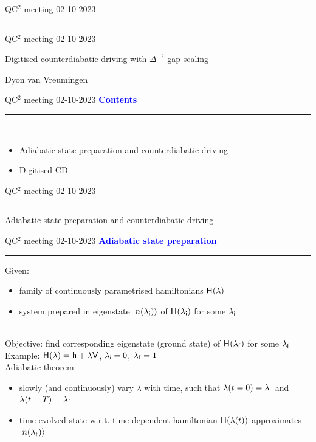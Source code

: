 \documentclass{beamer}
\def\gemph#1{{\color{mygreen}#1}}
\def\lbt{\small QC$^2$ meeting 02-10-2023} %
\def\mt#1{\kern0.025em\mathsf{#1}\kern0.025em}
\def\lambdai{\lambda_{\sf i}}
\def\lambdaf{\lambda_{\sf f}}
\def\H{\mt H}
\newenvironment{dia}[2]
{
	\begin{frame}
	\vspace{1mm}
	{\small #1}
	\hfill
    {\small\bf\textcolor{blue}{#2}}
	\vspace{3mm}
	\hrule
	\bigskip
}
{
	\vfill
	\end{frame}
}
\begin{document}

\begin{dia}{\lbt}{}
\vspace*{0.5cm}
\begin{center}
\begin{large}
QC$^2$ meeting 02-10-2023 \\[1.25cm]
\end{large}
\begin{LARGE}
\textcolor{mygreen}{Digitised counterdiabatic driving with $\Delta^{-?}$ gap scaling}\\[1.25cm]
\end{LARGE}
Dyon van Vreumingen
\end{center}
\end{dia}

\begin{dia}{\lbt}{Contents}
$ $\\
\begin{itemize}
    \setlength{\itemsep}{3mm}
    \item Adiabatic state preparation and counterdiabatic driving \pause
    \item Digitised CD
\end{itemize}
\vspace{3cm}
\end{dia}

\begin{dia}{\lbt}{}
\vspace{2.5cm}
\begin{center}
\begin{LARGE}
\textcolor{mygreen}{Adiabatic state preparation and counterdiabatic driving}
\end{LARGE}
\end{center}
\vspace*{1.5cm}
\end{dia}

\begin{dia}{\lbt}{Adiabatic state preparation}
Given: \pause
\begin{itemize}
    \item family of continuously parametrised hamiltonians $\H(\lambda)$ \pause
    \item system prepared in eigenstate $\ket{n(\lambdai)}$ of $\H(\lambdai)$ for some $\lambdai$ \pause
\end{itemize}
$ $\\[-2mm]
Objective: find corresponding eigenstate (ground state) of $\H(\lambdaf)$ for some $\lambdaf$ \pause \\[4mm]
Example: $\H(\lambda) = \mt h + \lambda \mt V$, $\lambdai = 0$, $\lambdaf = 1$ \pause \\[4mm]
\gemph{Adiabatic theorem}: \pause
\begin{itemize}
    \item slowly (and continuously) vary $\lambda$ with time, such that $\lambda(t=0) = \lambdai$ and $\lambda(t=T) = \lambdaf$ \pause
    \item time-evolved state w.r.t. time-dependent hamiltonian $\H(\lambda(t))$ approximates $\ket{n(\lambdaf)}$
\end{itemize}
\vspace{-1cm}
\end{dia}
\end{document}
